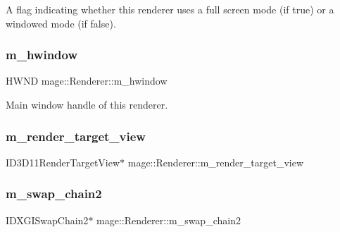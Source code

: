 A flag indicating whether this renderer uses a full screen mode (if {\ttfamily true}) or a windowed mode (if {\ttfamily false}). \hypertarget{classmage_1_1_renderer_afc314c8b146c3709edfd5349257a8387}{}\label{classmage_1_1_renderer_afc314c8b146c3709edfd5349257a8387} 
\subsubsection{\texorpdfstring{m\+\_\+hwindow}{m\_hwindow}}
{\footnotesize\ttfamily H\+W\+ND mage\+::\+Renderer\+::m\+\_\+hwindow\hspace{0.3cm}{\ttfamily [protected]}}

Main window handle of this renderer. \hypertarget{classmage_1_1_renderer_a60eeb3b440c2c8a027b583ab93830d73}{}\label{classmage_1_1_renderer_a60eeb3b440c2c8a027b583ab93830d73} 
\subsubsection{\texorpdfstring{m\+\_\+render\+\_\+target\+\_\+view}{m\_render\_target\_view}}
{\footnotesize\ttfamily I\+D3\+D11\+Render\+Target\+View$\ast$ mage\+::\+Renderer\+::m\+\_\+render\+\_\+target\+\_\+view\hspace{0.3cm}{\ttfamily [protected]}}

\hypertarget{classmage_1_1_renderer_a64eb8b31f6835322d13e1d9b8ea9e113}{}\label{classmage_1_1_renderer_a64eb8b31f6835322d13e1d9b8ea9e113} 
\subsubsection{\texorpdfstring{m\+\_\+swap\+\_\+chain2}{m\_swap\_chain2}}
{\footnotesize\ttfamily I\+D\+X\+G\+I\+Swap\+Chain2$\ast$ mage\+::\+Renderer\+::m\+\_\+swap\+\_\+chain2\hspace{0.3cm}{\ttfamily [protected]}}

